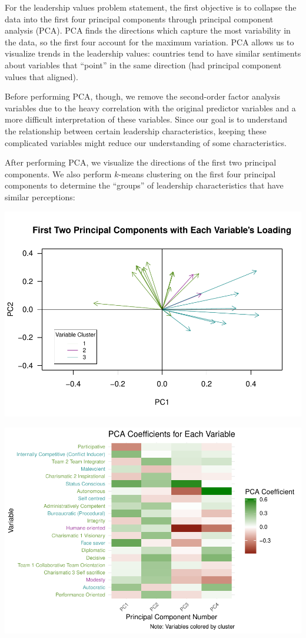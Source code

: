 \documentclass[
]{article}
\begin{document}
For the leadership values problem statement, the first objective is to
collapse the data into the first four principal components through
principal component analysis (PCA). PCA finds the directions which
capture the most variability in the data, so the first four account for
the maximum variation. PCA allows us to visualize trends in the
leadership values: countries tend to have similar sentiments about
variables that ``point'' in the same direction (had principal component
values that aligned).

Before performing PCA, though, we remove the second-order factor
analysis variables due to the heavy correlation with the original
predictor variables and a more difficult interpretation of these
variables. Since our goal is to understand the relationship between
certain leadership characteristics, keeping these complicated variables
might reduce our understanding of some characteristics.

After performing PCA, we visualize the directions of the first two
principal components. We also perform \(k\)-means clustering on the
first four principal components to determine the ``groups'' of
leadership characteristics that have similar perceptions:

\begin{center}\includegraphics[width=0.7\linewidth]{final_report_files/figure-latex/unnamed-chunk-3-1} \end{center}

\begin{center}\includegraphics[width=0.85\linewidth]{final_report_files/figure-latex/unnamed-chunk-4-1} \end{center}
\end{document}
